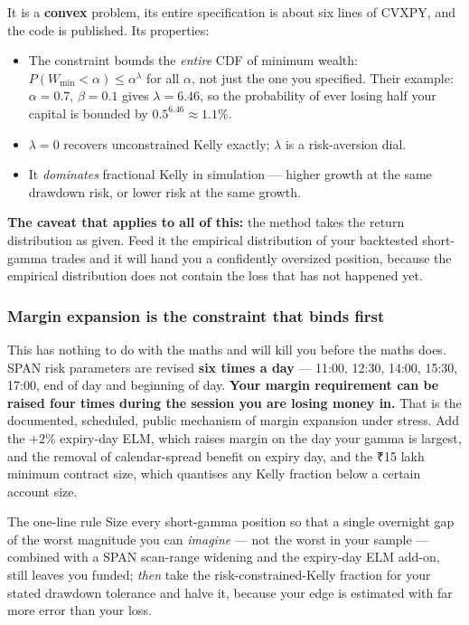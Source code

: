 \documentclass[11pt,a4paper]{article}
\newcommand{\rs}{₹}
\begin{document}
It is a \textbf{convex} problem, its entire specification is about six lines of
CVXPY, and the code is published. Its properties:

\begin{itemize}
\item The constraint bounds the \emph{entire} CDF of minimum wealth:
$P(W_{\min} < \alpha) \le \alpha^{\lambda}$ for all $\alpha$, not just the one you
specified. Their example: $\alpha = 0.7$, $\beta = 0.1$ gives $\lambda = 6.46$, so
the probability of ever losing half your capital is bounded by $0.5^{6.46}
\approx 1.1\%$.
\item $\lambda = 0$ recovers unconstrained Kelly exactly; $\lambda$ is a
risk-aversion dial.
\item It \emph{dominates} fractional Kelly in simulation --- higher growth at the
same drawdown risk, or lower risk at the same growth.
\end{itemize}

\textbf{The caveat that applies to all of this:} the method takes the return
distribution as given. Feed it the empirical distribution of your backtested
short-gamma trades and it will hand you a confidently oversized position, because
the empirical distribution does not contain the loss that has not happened yet.

\subsubsection{Margin expansion is the constraint that binds first}

This has nothing to do with the maths and will kill you before the maths does.
SPAN risk parameters are revised \textbf{six times a day} --- 11:00, 12:30, 14:00,
15:30, 17:00, end of day and beginning of day. \textbf{Your margin requirement can
be raised four times during the session you are losing money in.} That is the
documented, scheduled, public mechanism of margin expansion under stress. Add the
+2\% expiry-day ELM, which raises margin on the day your gamma is largest, and the
removal of calendar-spread benefit on expiry day, and the \rs 15 lakh minimum
contract size, which quantises any Kelly fraction below a certain account size.

\begin{keyfact}{The one-line rule}
Size every short-gamma position so that a single overnight gap of the worst
magnitude you can \emph{imagine} --- not the worst in your sample --- combined
with a SPAN scan-range widening and the expiry-day ELM add-on, still leaves you
funded; \emph{then} take the risk-constrained-Kelly fraction for your stated
drawdown tolerance and halve it, because your edge is estimated with far more
error than your loss.
\end{keyfact}
\end{document}
